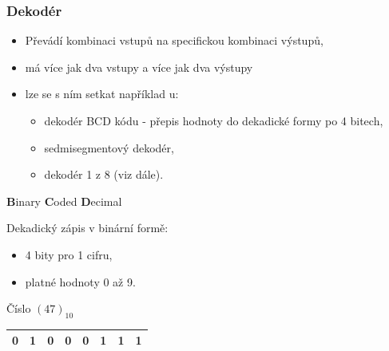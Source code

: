 	\begin{frame}
    \frametitle{Dekodér}

			\begin{itemize}
				\item Převádí kombinaci vstupů na specifickou kombinaci výstupů,
				\item má více jak dva vstupy a více jak dva výstupy
				\item lze se s ním setkat například u:
				
				\begin{itemize}
					\item dekodér BCD kódu - přepis hodnoty do dekadické formy po 4 bitech,
					\item sedmisegmentový dekodér,
					\item dekodér 1 z 8 (viz dále).
				\end{itemize}
			\end{itemize}
		\vspace{5mm}
		
		\begin{minipage}[t][0.3\textheight][t]{0.5\textwidth}
			\textbf{B}inary \textbf{C}oded \textbf{D}ecimal
			
			\vspace{2mm}
			Dekadický zápis v binární formě:
			
			\begin{itemize}
				\item 4 bity pro 1 cifru,
				\item platné hodnoty 0 až 9.
			\end{itemize}
			
		\end{minipage}
		\begin{minipage}[t][0.3\textheight][t]{0.45\textwidth}
		
			\vspace{5mm}
			\begin{center}
				Číslo $(47)_{10}$
				\begin{tabular}{ | c | c | c | c || c | c | c | c | }
					\hline
					0 & 1 & 0 & 0 & 0 & 1 & 1 & 1 \\ \hline
				\end{tabular}
			\end{center}
			
		\end{minipage}
	\end{frame}
	
